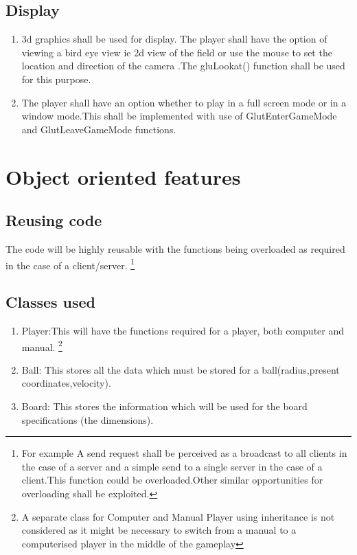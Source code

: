 \documentclass[11pt]{article}
\begin{document}
\subsection{Display}
\begin{enumerate}
\item 3d graphics shall be used for display. The player shall have the option of viewing a bird eye view ie 2d view of the field or use the mouse to set the location and direction of the camera .The gluLookat() function shall be used for this purpose.
 \item The player shall have an option whether to play in a full screen mode or in a window mode.This shall be implemented with use of GlutEnterGameMode and GlutLeaveGameMode functions.
\end{enumerate}
\pagebreak

\section{Object oriented features}
\subsection{Reusing code}
The code will be highly reusable with the functions being overloaded as required in the case of a client/server. 
\footnote{For example A send request shall be perceived as a broadcast to all clients in the case of a server and a simple send to a single server in the case of a client.This function could be overloaded.Other similar opportunities for overloading shall be exploited.}
\subsection{Classes used}
\begin{enumerate}
\item Player:This will have the functions required for a player, both computer and manual.
\footnote{A separate class for Computer and Manual Player using inheritance is not considered as it might be necessary to switch from a manual to a computerised player in the middle of the gameplay}
\item Ball: This stores all the data which must be stored for a ball(radius,present coordinates,velocity).
\item Board: This stores the information which will be used for the board specifications (the dimensions).
\end{enumerate}
\end{document}
